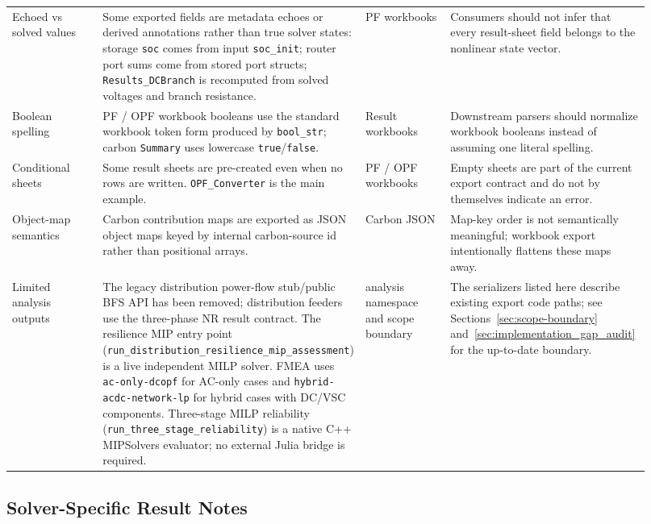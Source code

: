 \begin{longtable}{@{}L{0.18\linewidth}L{0.25\linewidth}L{0.17\linewidth}L{0.32\linewidth}@{}}
Echoed vs solved values & Some exported fields are metadata echoes or derived annotations rather than true solver states: storage \texttt{soc} comes from input \texttt{soc\_init}; router port sums come from stored port structs; \texttt{Results\_DCBranch} is recomputed from solved voltages and branch resistance. & PF workbooks & Consumers should not infer that every result-sheet field belongs to the nonlinear state vector. \\
Boolean spelling & PF / OPF workbook booleans use the standard workbook token form produced by \texttt{bool\_str}; carbon \texttt{Summary} uses lowercase \texttt{true}/\texttt{false}. & Result workbooks & Downstream parsers should normalize workbook booleans instead of assuming one literal spelling. \\
Conditional sheets & Some result sheets are pre-created even when no rows are written.  \texttt{OPF\_Converter} is the main example. & PF / OPF workbooks & Empty sheets are part of the current export contract and do not by themselves indicate an error. \\
Object-map semantics & Carbon contribution maps are exported as JSON object maps keyed by internal carbon-source id rather than positional arrays. & Carbon JSON & Map-key order is not semantically meaningful; workbook export intentionally flattens these maps away. \\
Limited analysis outputs & The legacy distribution power-flow stub/public BFS API has been removed; distribution feeders use the three-phase NR result contract.  The resilience MIP entry point (\texttt{run\_distribution\_resilience\_mip\_assessment}) is a live independent MILP solver.  FMEA uses \texttt{ac-only-dcopf} for AC-only cases and \texttt{hybrid-acdc-network-lp} for hybrid cases with DC/VSC components.  Three-stage MILP reliability (\texttt{run\_three\_stage\_reliability}) is a native C++ MIPSolvers evaluator; no external Julia bridge is required. & analysis namespace and scope boundary & The serializers listed here describe existing export code paths; see Sections~\ref{sec:scope-boundary} and~\ref{sec:implementation_gap_audit} for the up-to-date boundary. \\
\bottomrule
\end{longtable}

\subsection{Solver-Specific Result Notes}

